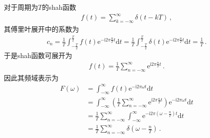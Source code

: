 对于周期为$T$的shah函数
\begin{align}
    f(t)=\sum\limits_{k=-\infty}^{\infty}\delta(t-kT)\, ,
\end{align}
其傅里叶展开中的系数为
\begin{align}
    c_n=\frac{1}{T}\int_{-\frac{T}{2}}^{\frac{T}{2}}f(t)\mathrm{e}^{-\mathrm{i}2\pi\frac{n}{T}t}\mathrm{d}t
    =\frac{1}{T}\int_{-\frac{T}{2}}^{\frac{T}{2}}\delta(t)\mathrm{e}^{-\mathrm{i}2\pi\frac{n}{T}t}\mathrm{d}t
    =\frac{1}{T}\, .
\end{align}
于是shah函数可展开为
\begin{align}
    f(t)=\frac{1}{T}\sum\limits_{n=-\infty}^{\infty}\mathrm{e}^{\mathrm{i}2\pi\frac{n}{T}t}\, .
\end{align}
因此其频域表示为
\begin{align}
    F(\omega) & =\int_{-\infty}^{\infty}f(t)\mathrm{e}^{-\mathrm{i}2\pi\omega t}\mathrm{d}t\nonumber                                                                                            \\
              & =\int_{-\infty}^{\infty}\left(\frac{1}{T}\sum\limits_{n=-\infty}^{\infty}\mathrm{e}^{\mathrm{i}2\pi\frac{n}{T}t}\right)\mathrm{e}^{-\mathrm{i}2\pi\omega t}\mathrm{d}t\nonumber \\
              & =\frac{1}{T}\sum\limits_{n=-\infty}^{\infty}\int_{-\infty}^{\infty}\mathrm{e}^{-\mathrm{i}2\pi(\omega-\frac{n}{T})t}\mathrm{d}t\nonumber                                        \\
              & =\frac{1}{T}\sum\limits_{n=-\infty}^{\infty}\delta\left(\omega-\frac{n}{T}\right)\, .
\end{align}